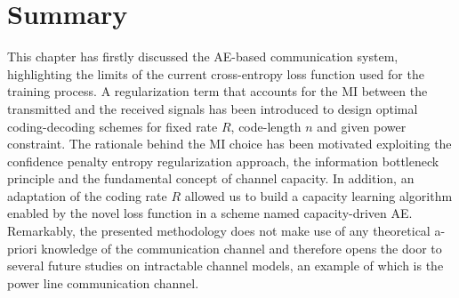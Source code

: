 \section{Summary}
\label{sec:autoencoders_conclusions}
This chapter has firstly discussed the AE-based communication system, highlighting the limits of the current cross-entropy loss function used for the training process. A regularization term that accounts for the MI between the transmitted and the received signals has been introduced to design optimal coding-decoding schemes for fixed rate $R$, code-length $n$ and given power constraint. The rationale behind the MI choice has been motivated exploiting the confidence penalty entropy regularization approach, the information bottleneck principle and the fundamental concept of channel capacity. In addition, an adaptation of the coding rate $R$ allowed us to build a capacity learning algorithm enabled by the novel loss function in a scheme named capacity-driven AE. Remarkably, the presented methodology does not make use of any theoretical a-priori knowledge of the communication channel and therefore opens the door to several future studies on intractable channel models, an example of which is the power line communication channel.